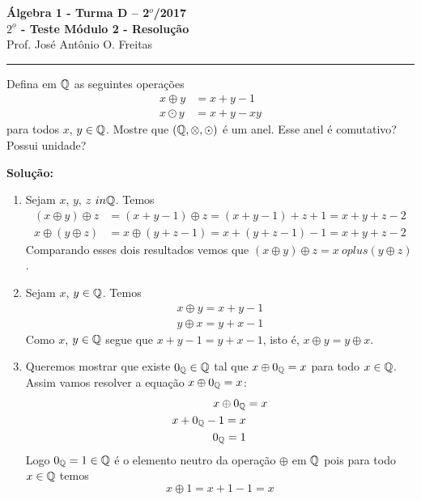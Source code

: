 \documentclass[12pt]{article}
\begin{document}


\begin{center}
{\Large\bf {\'A}lgebra 1 - Turma D -- 2$^{o}$/2017} \\ \vspace{9pt} {\large\bf
  $2^{\underline{o}}$ - Teste Módulo 2 - Resolu\c{c}\~ao}\\
\vspace{9pt} Prof. Jos{\'e} Ant{\^o}nio O. Freitas
\end{center}
\hrule

\vspace{.6cm}

\questao Defina em $\mathbb{Q}$ as seguintes operações
\begin{align*}
	x \oplus y &= x + y - 1\\
	x \odot y &= x + y - xy
\end{align*}
para todos $x$, $y \in \mathbb{Q}$. Mostre que $(\mathbb{Q}, \otimes, \odot)$ é um anel. Esse anel é comutativo? Possui unidade?

\noindent\textbf{Solu\c{c}\~ao:}
\begin{enumerate}
	\item Sejam $x$, $y$, $z \ in \mathbb{Q}$. Temos
	\begin{align*}
		(x \oplus y) \oplus z &= (x + y - 1) \oplus z = (x + y - 1) + z + 1 = x + y + z - 2\\
		x \oplus (y \oplus z) &= x \oplus (y + z - 1) = x + (y + z - 1) - 1 = x + y + z - 2
	\end{align*}
	Comparando esses dois resultados vemos que $(x \oplus y) \oplus z = x \ oplus (y \oplus z)$.

	\item Sejam $x$, $y \in \mathbb{Q}$. Temos
	\begin{align*}
		x \oplus y = x + y - 1\\
		y \oplus x = y + x - 1
	\end{align*}
	Como $x$, $y \in \mathbb{Q}$ segue que $x + y - 1 = y + x - 1$, isto é, $x \oplus y = y \oplus x$.

	\item Queremos mostrar que existe $0_{\mathbb{Q}} \in \mathbb{Q}$ tal que $x \oplus 0_{\mathbb{Q}} = x$ para todo $x \in \mathbb{Q}$.
	Assim vamos resolver a equação $x \oplus 0_{\mathbb{Q}} = x$:
	\begin{align*}
		x\oplus 0_{\mathbb{Q}} &= x\\
		x + 0_{\mathbb{Q}} - 1 = x\\
		0_{\mathbb{Q}} = 1
	\end{align*}
	Logo $0_{\mathbb{Q}} = 1 \in \mathbb{Q}$ é o elemento neutro da operação $\oplus$ em $\mathbb{Q}$ pois para todo $x \in \mathbb{Q}$ temos
	\[
		x \oplus 1 = x + 1 - 1 = x
	\]
\end{enumerate}
\end{document}
